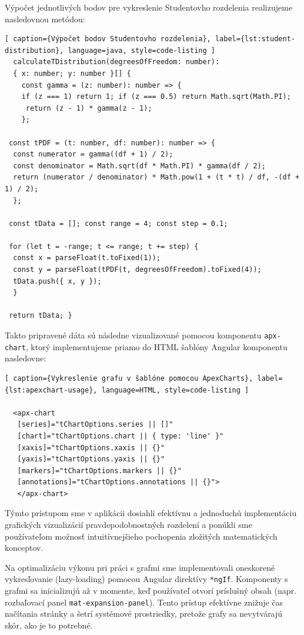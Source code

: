  Výpočet jednotlivých bodov pre vykreslenie Studentovho rozdelenia realizujeme nasledovnou metódou:
 
 \begin{lstlisting}[ caption={Výpočet bodov Studentovho rozdelenia}, label={lst:student-distribution}, language=java, style=code-listing ] 
  calculateTDistribution(degreesOfFreedom: number): 
  { x: number; y: number }[] { 
    const gamma = (z: number): number => { 
    if (z === 1) return 1; if (z === 0.5) return Math.sqrt(Math.PI);
     return (z - 1) * gamma(z - 1); 
    };
 
 const tPDF = (t: number, df: number): number => { 
  const numerator = gamma((df + 1) / 2);
  const denominator = Math.sqrt(df * Math.PI) * gamma(df / 2); 
  return (numerator / denominator) * Math.pow(1 + (t * t) / df, -(df + 1) / 2); 
  };
 
 const tData = []; const range = 4; const step = 0.1;
 
 for (let t = -range; t <= range; t += step) { 
  const x = parseFloat(t.toFixed(1));
  const y = parseFloat(tPDF(t, degreesOfFreedom).toFixed(4));
  tData.push({ x, y }); 
  }
 
 return tData; } 

\end{lstlisting}

Takto pripravené dáta sú následne vizualizované pomocou komponentu \texttt{apx-chart}, ktorý implementujeme priamo do HTML šablóny Angular komponentu nasledovne:

\begin{lstlisting}[ caption={Vykreslenie grafu v šablóne pomocou ApexCharts}, label={lst:apexchart-usage}, language=HTML, style=code-listing ]
  
  <apx-chart 
   [series]="tChartOptions.series || []" 
   [chart]="tChartOptions.chart || { type: 'line' }" 
   [xaxis]="tChartOptions.xaxis || {}" 
   [yaxis]="tChartOptions.yaxis || {}" 
   [markers]="tChartOptions.markers || {}" 
   [annotations]="tChartOptions.annotations || {}"> 
   </apx-chart> 

  \end{lstlisting}

Týmto prístupom sme v aplikácii dosiahli efektívnu a jednoduchú implementáciu grafických vizualizácií pravdepodobnostných rozdelení a ponúkli sme používateľom možnosť intuitívnejšieho pochopenia zložitých matematických konceptov.

Na optimalizáciu výkonu pri práci s grafmi sme implementovali oneskorené vykresľovanie (lazy-loading) pomocou Angular direktívy \texttt{*ngIf}. 
Komponenty s grafmi sa inicializujú až v momente, keď používateľ otvorí príslušný obsah (napr. rozbaľovací panel \texttt{mat-expansion-panel}).
 Tento prístup efektívne znižuje čas načítania stránky a šetrí systémové prostriedky, pretože grafy sa nevytvárajú skôr, ako je to potrebné.
 

